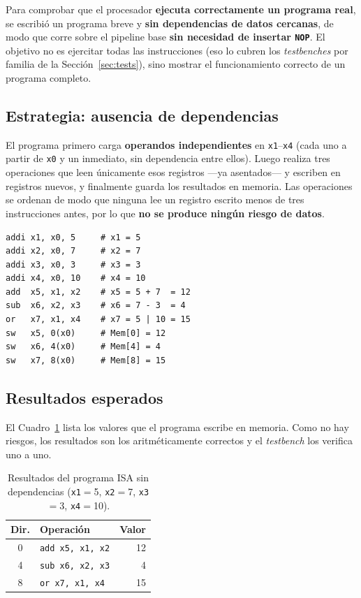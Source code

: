 \documentclass[11pt,a4paper]{article}
\begin{document}
Para comprobar que el procesador \textbf{ejecuta correctamente un programa real}, se
escribió un programa breve y \textbf{sin dependencias de datos cercanas}, de modo que
corre sobre el pipeline base \textbf{sin necesidad de insertar \texttt{NOP}}. El objetivo
no es ejercitar todas las instrucciones (eso lo cubren los \textit{testbenches} por
familia de la Sección~\ref{sec:tests}), sino mostrar el funcionamiento correcto de un
programa completo.

\subsection{Estrategia: ausencia de dependencias}

El programa primero carga \textbf{operandos independientes} en \texttt{x1}--\texttt{x4}
(cada uno a partir de \texttt{x0} y un inmediato, sin dependencia entre ellos). Luego
realiza tres operaciones que leen únicamente esos registros ---ya asentados--- y escriben
en registros nuevos, y finalmente guarda los resultados en memoria. Las operaciones se
ordenan de modo que ninguna lee un registro escrito menos de tres instrucciones antes,
por lo que \textbf{no se produce ningún riesgo de datos}.

\begin{lstlisting}[language={}]
addi x1, x0, 5     # x1 = 5
addi x2, x0, 7     # x2 = 7
addi x3, x0, 3     # x3 = 3
addi x4, x0, 10    # x4 = 10
add  x5, x1, x2    # x5 = 5 + 7  = 12
sub  x6, x2, x3    # x6 = 7 - 3  = 4
or   x7, x1, x4    # x7 = 5 | 10 = 15
sw   x5, 0(x0)     # Mem[0] = 12
sw   x6, 4(x0)     # Mem[4] = 4
sw   x7, 8(x0)     # Mem[8] = 15
\end{lstlisting}

\subsection{Resultados esperados}

El Cuadro~\ref{cuadro:resultados} lista los valores que el programa escribe en memoria.
Como no hay riesgos, los resultados son los aritméticamente correctos y el
\textit{testbench} los verifica uno a uno.

\begin{table}[ht]
	\centering
	\begin{tabular}{@{}clr@{}}
		\toprule
		\textbf{Dir.} & \textbf{Operación}      & \textbf{Valor} \\
		\midrule
		0             & \texttt{add x5, x1, x2} & 12             \\
		4             & \texttt{sub x6, x2, x3} & 4              \\
		8             & \texttt{or  x7, x1, x4} & 15             \\
		\bottomrule
	\end{tabular}
	\caption{Resultados del programa ISA sin dependencias
		(\texttt{x1}$=$5, \texttt{x2}$=$7, \texttt{x3}$=$3, \texttt{x4}$=$10).}
	\label{cuadro:resultados}
\end{table}
\end{document}
